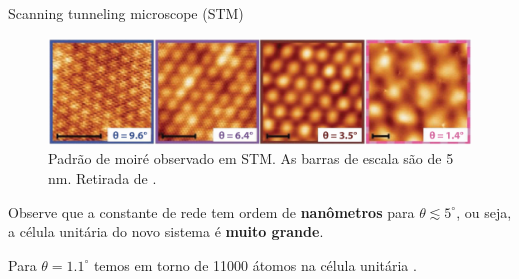 \documentclass[8pt,aspectratio=169,xcolor={table,dvipsnames,usenames}]{beamer}
\begin{document}

\begin{frame}{Scanning tunneling microscope (STM)}

\begin{figure}[H]
\centering
\includegraphics[width=\linewidth]{fig/stm.png}
\caption{Padrão de moiré observado em STM. As barras de escala são de 5 nm. Retirada de \cite{handbook2019}.}
\label{fig:stm}
\end{figure}

Observe que a constante de rede tem ordem de \textbf{nanômetros} para $\theta \lesssim 5^\circ$, ou seja, a célula unitária do novo sistema é \textbf{muito grande}.

\n

Para $\theta=1.1^\circ$ temos em torno de 11000 átomos na célula unitária \cite{rennella}.

\end{frame}

\end{document}
